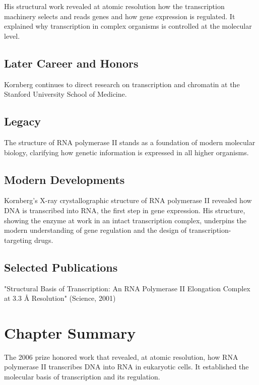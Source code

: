 His structural work revealed at atomic resolution how the transcription machinery selects and reads genes and how gene expression is regulated. It explained why transcription in complex organisms is controlled at the molecular level.

\subsection*{Later Career and Honors}

Kornberg continues to direct research on transcription and chromatin at the Stanford University School of Medicine.

\subsection*{Legacy}

The structure of RNA polymerase II stands as a foundation of modern molecular biology, clarifying how genetic information is expressed in all higher organisms.

\subsection*{Modern Developments}

Kornberg's X-ray crystallographic structure of RNA polymerase II revealed how DNA is transcribed into RNA, the first step in gene expression. His structure, showing the enzyme at work in an intact transcription complex, underpins the modern understanding of gene regulation and the design of transcription-targeting drugs.

\subsection*{Selected Publications}

"Structural Basis of Transcription: An RNA Polymerase II Elongation Complex at 3.3 Å Resolution" (Science, 2001)

\clearpage

\section*{Chapter Summary}

The 2006 prize honored work that revealed, at atomic resolution, how RNA polymerase II transcribes DNA into RNA in eukaryotic cells. It established the molecular basis of transcription and its regulation.
